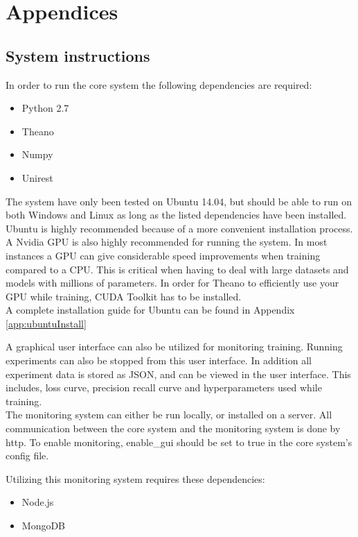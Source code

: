 \appendix
\chapter*{Appendices}
\renewcommand{\thesection}{\Alph{section}}

\section{System instructions}
In order to run the core system the following dependencies are required:
\begin{itemize}
\item Python 2.7
\item Theano
\item Numpy
\item Unirest
\end{itemize}

The system have only been tested on Ubuntu 14.04, but should be able to run on both Windows and Linux as long as the listed dependencies have been installed. Ubuntu is highly recommended because of a more convenient installation process. \\

A Nvidia GPU is also highly recommended for running the system. In most instances a GPU can give considerable speed improvements when training compared to a CPU. This is critical when having to deal with large datasets and models with millions of parameters. In order for Theano to efficiently use your GPU while training, CUDA Toolkit has to be installed. \\

A complete installation guide for Ubuntu can be found in Appendix \ref{app:ubuntuInstall}


A graphical user interface can also be utilized for monitoring training. Running experiments can also be stopped from this user interface. In addition all experiment data is stored as JSON, and can be viewed in the user interface. This includes, loss curve, precision recall curve and hyperparameters used while training. \\

The monitoring system can either be run locally, or installed on a server. All communication between the core system and the monitoring system is done by http. To enable monitoring, enable\_gui should be set to true in the core system's config file.

Utilizing this monitoring system requires these dependencies:
\begin{itemize}
\item Node.js
\item MongoDB
\end{itemize}

